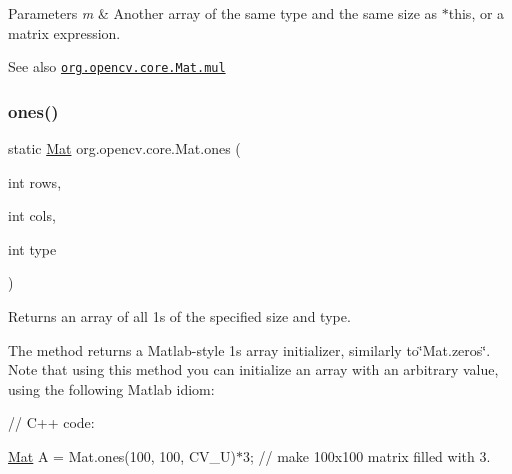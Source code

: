 {\ttfamily 
\begin{DoxyParams}{Parameters}
{\em m} & Another array of the same type and the same size as {\ttfamily $\ast$this}, or a matrix expression.\\
\hline
\end{DoxyParams}
\begin{DoxySeeAlso}{See also}
\href{http://docs.opencv.org/modules/core/doc/basic_structures.html#mat-mul}{\tt org.\+opencv.\+core.\+Mat.\+mul} 
\end{DoxySeeAlso}
}\mbox{\label{classorg_1_1opencv_1_1core_1_1_mat_a34d703df023730d043298601b6962f57}} 
\subsubsection{\texorpdfstring{ones()}{ones()}\hspace{0.1cm}{\footnotesize\ttfamily [1/2]}}
{\footnotesize\ttfamily static \mbox{\hyperlink{classorg_1_1opencv_1_1core_1_1_mat}{Mat}} org.\+opencv.\+core.\+Mat.\+ones (\begin{DoxyParamCaption}\item[{int}]{rows,  }\item[{int}]{cols,  }\item[{int}]{type }\end{DoxyParamCaption})\hspace{0.3cm}{\ttfamily [static]}}

Returns an array of all 1\textquotesingle{}s of the specified size and type.

The method returns a Matlab-\/style 1\textquotesingle{}s array initializer, similarly to\char`\"{}\+Mat.\+zeros\char`\"{}. Note that using this method you can initialize an array with an arbitrary value, using the following Matlab idiom\+: {\ttfamily }

{\ttfamily }

{\ttfamily }

{\ttfamily // C++ code\+:}

{\ttfamily }

{\ttfamily }

{\ttfamily \mbox{\hyperlink{classorg_1_1opencv_1_1core_1_1_mat}{Mat}} A = Mat.\+ones(100, 100, C\+V\+\_\+U)$\ast$3; // make 100x100 matrix filled with 3.}

